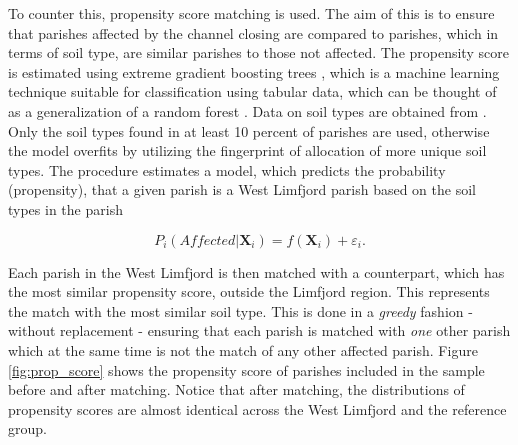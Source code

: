 \documentclass[11pt]{article}
\begin{document}
To counter this, propensity score matching is used. The aim of this is to ensure that parishes affected by the channel closing are compared to parishes, which in terms of soil type, are similar parishes to those not affected. The propensity score is estimated using extreme gradient boosting trees \citep{chen2016xgboost}, which is a machine learning technique suitable for classification using tabular data, which can be thought of as a generalization of a random forest \citep{Breiman2001}. Data on soil types are obtained from \cite{Pedersen2019}. Only the soil types found in at least 10 percent of parishes are used, otherwise the model overfits by utilizing the fingerprint of allocation of more unique soil types. The procedure estimates a model, which predicts the probability (propensity), that a given parish is a West Limfjord parish based on the soil types in the parish

\begin{equation}
\label{eq:eq7_5}
P_i(Affected|\mathbf{X}_i) = f(\mathbf{X}_i)+\varepsilon_i.
\end{equation}

Each parish in the West Limfjord is then matched with a counterpart, which has the most similar propensity score, outside the Limfjord region. This represents the match with the most similar soil type. This is done in a \textit{greedy} fashion - without replacement - ensuring that each parish is matched with \textit{one} other parish which at the same time is not the match of any other affected parish. Figure \ref{fig:prop_score} shows the propensity score of parishes included in the sample before and after matching. Notice that after matching, the distributions of propensity scores are almost identical across the West Limfjord and the reference group. 
\end{document}
